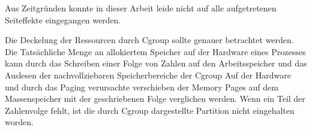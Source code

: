 Aus Zeitgründen konnte in dieser Arbeit leide nicht auf alle aufgetretenen Seiteffekte eingegangen werden. 

Die Deckelung der Ressourcen durch Cgroup sollte genauer betrachtet werden. Die Tatsächliche Menge an allokiertem Speicher auf der Hardware eines Prozesses kann durch das Schreiben einer Folge von Zahlen auf den Arbeitsspeicher und das Auslesen der nachvollziebaren Speicherbereiche der Cgroup Auf der Hardware und durch das Paging verursachte verschieben der Memory Pages auf dem Massenspeicher mit der geschriebenen Folge verglichen werden. Wenn ein Teil der Zahlenvolge fehlt, ist die durch Cgroup dargestellte Partition nicht eingehalten worden. 

\pagebreak